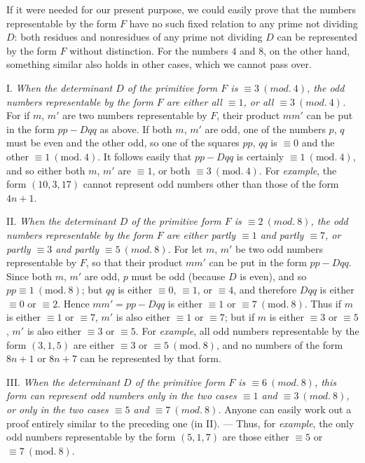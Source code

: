 If it were needed for our present purpose, we could easily prove that the numbers representable by the form $F$ have no such fixed relation to any prime not dividing $D$: both residues and nonresidues of any prime not dividing $D$ can be represented by the form $F$ without distinction. For the numbers $4$ and $8$, on the other hand, something similar also holds in other cases, which we cannot pass over.

I. \textit{When the determinant $D$ of the primitive form $F$ is $\equiv3\ (\mathit{mod.}\ 4)$, the odd numbers representable by the form $F$ are either all $\equiv1$, or all $\equiv3\ (\mathit{mod.}\ 4)$.} For if $m$, $m'$ are two numbers representable by $F$, their product $mm'$ can be put in the form $pp-Dqq$ as above. If both $m$, $m'$ are odd, one of the numbers $p$, $q$ must be even and the other odd, so one of the squares $pp$, $qq$ is $\equiv0$ and the other $\equiv1\ (\mathrm{mod.}\ 4)$. It follows easily that $pp-Dqq$ is certainly $\equiv1\ (\mathrm{mod.}\ 4)$, and so either both $m$, $m'$ are $\equiv1$, or both $\equiv3\ (\mathrm{mod.}\ 4)$. For \textit{example}, the form $(10,3,17)$ cannot represent odd numbers other than those of the form $4n+1$.

II. \textit{When the determinant $D$ of the primitive form $F$ is $\equiv2\ (\mathit{mod.}\ 8)$, the odd numbers representable by the form $F$ are either partly $\equiv1$ and partly $\equiv7$, or partly $\equiv3$ and partly $\equiv5\ (\mathit{mod.}\ 8)$.} For let $m$, $m'$ be two odd numbers
representable by $F$, so that their product $mm'$ can be put in the form $pp-Dqq$. Since both $m$, $m'$ are odd, $p$ must be odd (because $D$ is even), and so $pp\equiv1\ (\mathrm{mod.}\ 8)$; but $qq$ is either $\equiv0$, $\equiv1$, or $\equiv4$, and therefore $Dqq$ is either $\equiv0$ or $\equiv2$. Hence $mm'=pp-Dqq$ is either $\equiv1$ or $\equiv7\ (\mathrm{mod.}\ 8)$. Thus if $m$ is either $\equiv1$ or $\equiv7$, $m'$ is also either $\equiv1$ or $\equiv7$; but if $m$ is either $\equiv3$ or $\equiv5$, $m'$ is also either $\equiv3$ or $\equiv5$. For \textit{example}, all odd numbers representable by the form $(3,1,5)$ are either $\equiv3$ or $\equiv5\ (\mathrm{mod.}\ 8)$, and no numbers of the form $8n+1$ or $8n+7$ can be represented by that form.

III. \textit{When the determinant $D$ of the primitive form $F$ is $\equiv6\ (\mathit{mod.}\ 8)$, this form can represent odd numbers only in the two cases $\equiv1$ and $\equiv3\ (\mathit{mod.}\ 8)$, or only in the two cases $\equiv5$ and $\equiv7\ (\mathit{mod.}\ 8)$.} Anyone can easily work out a proof entirely similar to the preceding one (in II). --- Thus, for \textit{example}, the only odd numbers representable by the form $(5,1,7)$ are those either $\equiv5$ or $\equiv7\ (\mathrm{mod.}\ 8)$.

